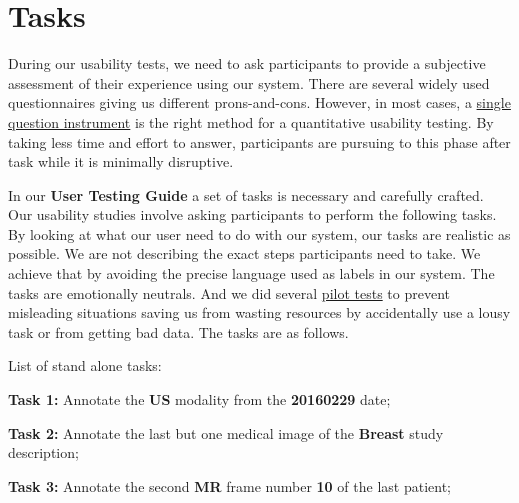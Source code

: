 \section{Tasks}

During our usability tests, we need to ask participants to provide a subjective assessment of their experience using our system. There are several widely used questionnaires giving us different prons-and-cons. However, in most cases, a \hyperlink{https://www.nngroup.com/articles/keep-online-surveys-short/}{single question instrument} \cite{sauro201210} is the right method for a quantitative usability testing. By taking less time and effort to answer, participants are pursuing to this phase after task while it is minimally disruptive.

In our \textbf{User Testing Guide} a set of tasks is necessary and carefully crafted. Our usability studies involve asking participants to perform the following tasks. By looking at what our user need to do with our system, our tasks are realistic as possible. We are not describing the exact steps participants need to take. We achieve that by avoiding the precise language used as labels in our system. The tasks are emotionally neutrals. And we did several \hyperlink{https://www.nngroup.com/articles/pilot-testing/}{pilot tests} to prevent misleading situations saving us from wasting resources by accidentally use a lousy task or from getting bad data. The tasks are as follows.

\hfill

List of stand alone tasks:

\hfill

\textbf{Task 1:} Annotate the \textbf{US} modality from the \textbf{20160229} date;

\hfill

\textbf{Task 2:} Annotate the last but one medical image of the \textbf{Breast} study description;

\hfill

\textbf{Task 3:} Annotate the second \textbf{MR} frame number \textbf{10} of the last patient;

\hfill

\clearpage